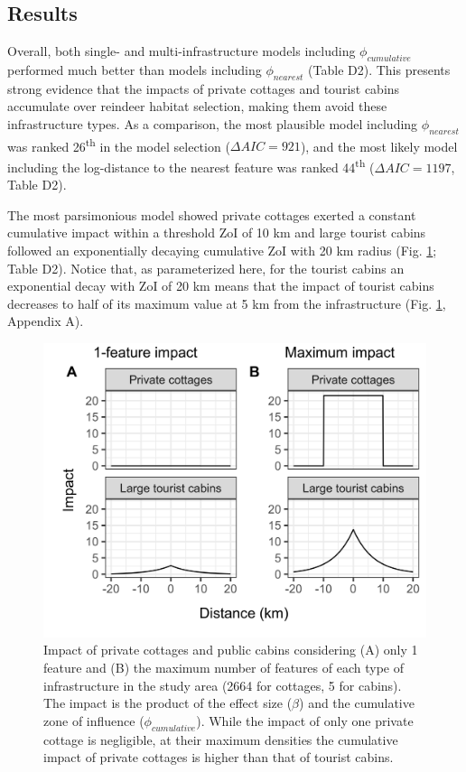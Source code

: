 \documentclass[titlepage]{article}
\begin{document}
\subsection{Results}

Overall, both single- and multi-infrastructure models including $\phi_{cumulative}$ performed much better than models including $\phi_{nearest}$ (Table D2). This presents strong evidence that the impacts of private cottages and tourist cabins accumulate over reindeer habitat selection, making them avoid these infrastructure types. As a comparison, the most plausible model including $\phi_{nearest}$ was ranked 26\textsuperscript{th} in the model selection ($\Delta AIC = 921$), and the most likely model including the log-distance to the nearest feature was ranked 44\textsuperscript{th} ($\Delta AIC = 1197$, Table D2).

The most parsimonious model showed private cottages exerted a constant cumulative impact within a threshold ZoI of 10 km and large tourist cabins followed an exponentially decaying cumulative ZoI with 20 km radius (Fig. \ref{fig:impact_plot}; Table D2). Notice that, as parameterized here, for the tourist cabins an exponential decay with ZoI of 20 km means
that the impact of tourist cabins decreases to half of its maximum value
at 5 km from the infrastructure (Fig. \ref{fig:impact_plot}, Appendix A). 

\begin{figure}[h]
\centering
\includegraphics[width=1\textwidth,center]{figures/reindeer_zoi_impact_single_multiple_features.png}
\caption{\label{fig:impact_plot} Impact of private cottages and public cabins considering (A) only 1 feature and (B) the maximum number of features of each type of infrastructure in the study area (2664 for cottages, 5 for cabins). The impact is the product of the effect size ($\beta$) and the cumulative zone of influence ($\phi_{cumulative}$). While the impact of only one private cottage is negligible, at their maximum densities the cumulative impact of private cottages is higher than that of tourist cabins.}
\end{figure}
\end{document}
